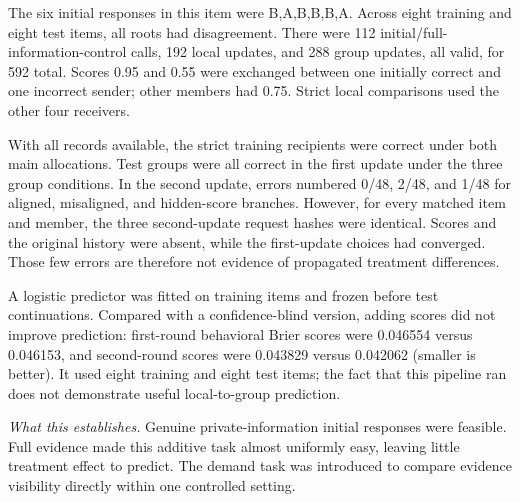 \documentclass[11pt]{article}
\newcommand{\takeaway}[1]{\par\smallskip\noindent\textit{What this establishes.} #1\par\medskip}
\begin{document}
The six initial responses in this item were B,A,B,B,B,A. Across eight training and eight test items, all roots had disagreement. There were 112 initial/full-information-control calls, 192 local updates, and 288 group updates, all valid, for 592 total. Scores 0.95 and 0.55 were exchanged between one initially correct and one incorrect sender; other members had 0.75. Strict local comparisons used the other four receivers.

With all records available, the strict training recipients were correct under both main allocations. Test groups were all correct in the first update under the three group conditions. In the second update, errors numbered 0/48, 2/48, and 1/48 for aligned, misaligned, and hidden-score branches. However, for every matched item and member, the three second-update request hashes were identical. Scores and the original history were absent, while the first-update choices had converged. Those few errors are therefore not evidence of propagated treatment differences.

A logistic predictor was fitted on training items and frozen before test continuations. Compared with a confidence-blind version, adding scores did not improve prediction: first-round behavioral Brier scores were 0.046554 versus 0.046153, and second-round scores were 0.043829 versus 0.042062 (smaller is better). It used eight training and eight test items; the fact that this pipeline ran does not demonstrate useful local-to-group prediction.

\takeaway{Genuine private-information initial responses were feasible. Full evidence made this additive task almost uniformly easy, leaving little treatment effect to predict. The demand task was introduced to compare evidence visibility directly within one controlled setting.}
\end{document}
